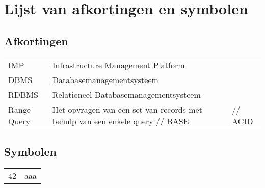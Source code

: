 \chapter{Lijst van afkortingen en symbolen}
\section*{Afkortingen}
\begin{flushleft}
  \renewcommand{\arraystretch}{1.1}
  \begin{tabularx}{\textwidth}{@{}p{12mm}X@{}}
    IMP   & Infrastructure Management Platform \\
    DBMS   & Databasemanagementsysteem \\
    RDBMS   & Relationeel Databasemanagementsysteem \\
    Range Query & Het opvragen van een set van records met behulp van een enkele query //
    BASE & //
    ACID & 
  \end{tabularx}
\end{flushleft}
\section*{Symbolen}
\begin{flushleft}
  \renewcommand{\arraystretch}{1.1}
  \begin{tabularx}{\textwidth}{@{}p{12mm}X@{}}
    42    & aaa \\
  \end{tabularx}
\end{flushleft}